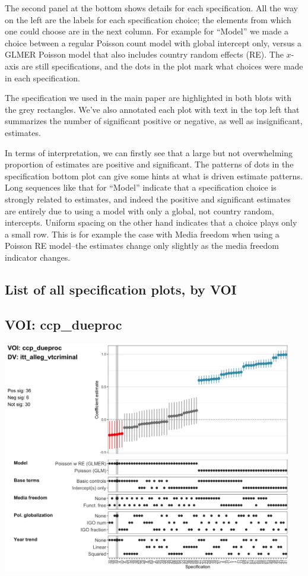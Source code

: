 \documentclass[]{article}
\begin{document}
The second panel at the bottom shows details for each specification. All
the way on the left are the labels for each specification choice; the
elements from which one could choose are in the next column. For example
for ``Model'' we made a choice between a regular Poisson count model
with global intercept only, versus a GLMER Poisson model that also
includes country random effects (RE). The \(x\)-axis are still
specifications, and the dots in the plot mark what choices were made in
each specification.

The specification we used in the main paper are highlighted in both
blots with the grey rectangles. We've also annotated each plot with text
in the top left that summarizes the number of significant positive or
negative, as well as insignificant, estimates.

In terms of interpretation, we can firstly see that a large but not
overwhelming proportion of estimates are positive and significant. The
patterns of dots in the specification bottom plot can give some hints at
what is driven estimate patterns. Long sequences like that for ``Model''
indicate that a specification choice is strongly related to estimates,
and indeed the positive and significant estimates are entirely due to
using a model with only a global, not country random, intercepts.
Uniform spacing on the other hand indicates that a choice plays only a
small row. This is for example the case with Media freedom when using a
Poisson RE model--the estimates change only slightly as the media
freedom indicator changes.

\hypertarget{list-of-all-specification-plots-by-voi}{%
\subsection{List of all specification plots, by
VOI}\label{list-of-all-specification-plots-by-voi}}

\hypertarget{voi-ccp_dueproc}{%
\subsection{VOI: ccp\_dueproc}\label{voi-ccp_dueproc}}

\includegraphics[height=4in]{../output/figures-robustness/specplot-ccp_dueproc-itt_alleg_vtcriminal.png}
\end{document}
